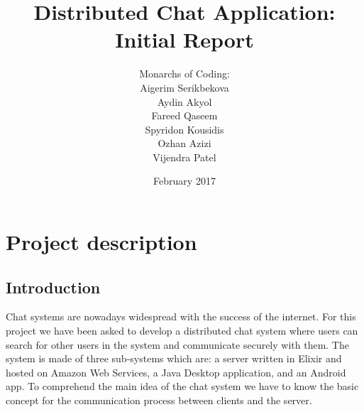 \documentclass[11pt,a4paper]{report}
\begin{document}
\title{Distributed Chat Application: Initial Report}
\author{Monarchs of Coding:\\
  Aigerim Serikbekova\\
  Aydin Akyol\\
  Fareed Qaseem\\
  Spyridon Kousidis\\
  Ozhan Azizi\\
  Vijendra Patel}
\date{February 2017}
\maketitle


\chapter{Project description}

\section{Introduction}
Chat systems are nowadays widespread with the success of the internet. For this project we have been asked to develop a distributed chat system where users can search for other users in the system and communicate securely with them. The system is made of three sub-systems which are: a server written in Elixir and hosted on Amazon Web Services, a Java Desktop application, and an Android app. To comprehend the main idea of the chat system we have to know the basic concept for the communication process between clients and the server.
\end{document}
